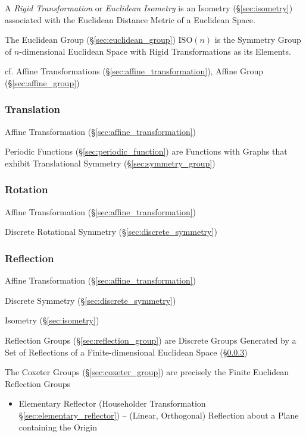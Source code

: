 A \emph{Rigid Transformation} or \emph{Euclidean Isometry} is an Isometry
(\S\ref{sec:isometry}) associated with the Euclidean Distance Metric of a
Euclidean Space.

The Euclidean Group (\S\ref{sec:euclidean_group}) $\mathrm{ISO}(n)$ is the
Symmetry Group of $n$-dimensional Euclidean Space with Rigid Transformations as
its Elements.

cf. Affine Transformations (\S\ref{sec:affine_transformation}), Affine Group
(\S\ref{sec:affine_group})



\subsubsection{Translation}\label{sec:translation}

Affine Transformation (\S\ref{sec:affine_transformation})

\fist Periodic Functions (\S\ref{sec:periodic_function}) are Functions with
Graphs that exhibit Translational Symmetry (\S\ref{sec:symmetry_group})



\subsubsection{Rotation}\label{sec:rotation}

Affine Transformation (\S\ref{sec:affine_transformation})

Discrete Rotational Symmetry (\S\ref{sec:discrete_symmetry})



\subsubsection{Reflection}\label{sec:reflection}

Affine Transformation (\S\ref{sec:affine_transformation})

Discrete Symmetry (\S\ref{sec:discrete_symmetry})

Isometry (\S\ref{sec:isometry})

Reflection Groups (\S\ref{sec:reflection_group}) are Discrete Groups Generated
by a Set of Reflections of a Finite-dimensional Euclidean Space
(\S\ref{sec:reflection})

The Coxeter Groups (\S\ref{sec:coxeter_group}) are precisely the Finite
Euclidean Reflection Groups

\begin{itemize}
  \item Elementary Reflector (Householder Transformation
    \S\ref{sec:elementary_reflector}) -- (Linear, Orthogonal) Reflection about
    a Plane containing the Origin
\end{itemize}




